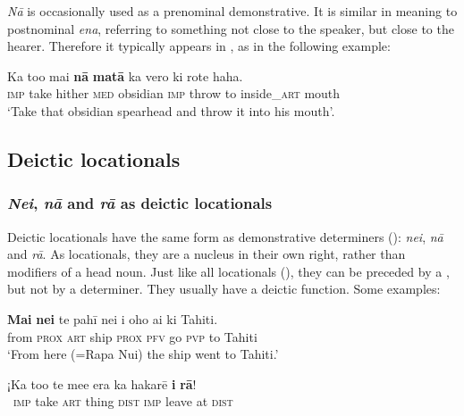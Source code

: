 \textit{Nā} is occasionally used as a prenominal demonstrative. It is similar in meaning to postnominal \textit{ena}, referring to something not close to the speaker, but close to the hearer. Therefore it typically appears in , as in the following example:

\ea\label{ex:4.225}
\gll Ka to{\ꞌ}o mai \textbf{nā} \textbf{matā} ka vero ki rote haha. \\
\textsc{imp} take hither \textsc{med} obsidian \textsc{imp} throw to inside\_\textsc{art} mouth \\

\glt 
‘Take that obsidian spearhead and throw it into his mouth’. \textstyleExampleref{[R304.020]} 
\z
{}
\subsection{Deictic locationals}\label{sec:4.6.5}
\subsubsection{\textit{Nei}, \textit{nā} and \textit{rā} as deictic locationals}\label{sec:4.6.5.1}

Deictic locationals have the same form as demonstrative determiners (): \textit{nei}, \textit{nā} and \textit{rā}. As locationals, they are a nucleus in their own right, rather than modifiers of a head noun. Just like all locationals (), they can be preceded by a , but not by a determiner. They usually have a deictic function. Some examples:

\ea\label{ex:4.226}
\gll \textbf{Mai} \textbf{nei} te pahī nei i oho ai ki Tahiti. \\
from \textsc{prox} \textsc{art} ship \textsc{prox} \textsc{pfv} go \textsc{pvp} to Tahiti \\

\glt 
‘From here (=Rapa Nui) the ship went to Tahiti.’ \textstyleExampleref{[R239.091]} 
\z

\ea\label{ex:4.227}
\gll ¡Ka to{\ꞌ}o te me{\ꞌ}e era ka hakarē \textbf{{\ꞌ}i} \textbf{rā}! \\
~\textsc{imp} take \textsc{art} thing \textsc{dist} \textsc{imp} leave at \textsc{dist} \\

